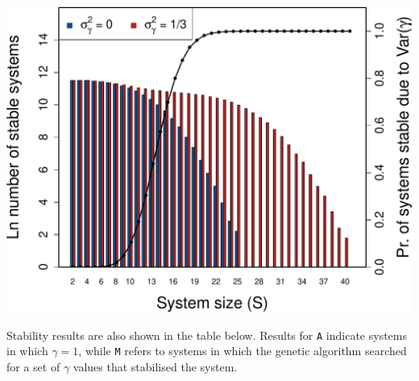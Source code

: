 \documentclass[]{article}
\begin{document}
\includegraphics{unnamed-chunk-30-1.pdf}

Stability results are also shown in the table below. Results for
\texttt{A} indicate systems in which \(\gamma = 1\), while \texttt{M}
refers to systems in which the genetic algorithm searched for a set of
\(\gamma\) values that stabilised the system.
\end{document}
